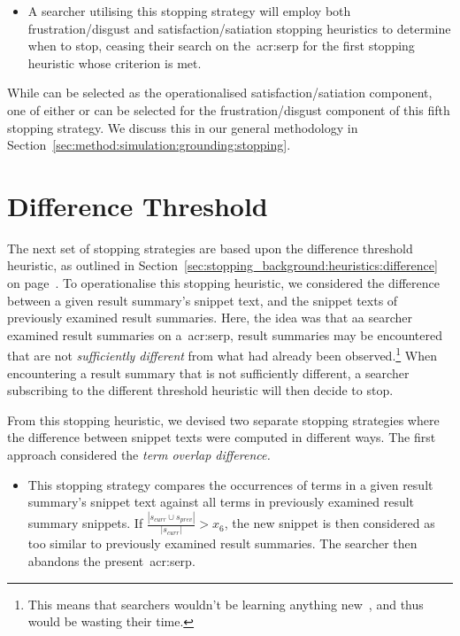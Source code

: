 \begin{itemize}
    \item{ A searcher utilising this stopping strategy will employ both frustration/disgust and satisfaction/satiation stopping heuristics to determine when to stop, ceasing their search on the~\gls{acr:serp} for the first stopping heuristic whose criterion is met.}
\end{itemize}

While  can be selected as the operationalised satisfaction/satiation component, one of either  or  can be selected for the frustration/disgust component of this fifth stopping strategy. We discuss this in our general methodology in Section~\ref{sec:method:simulation:grounding:stopping}.

\section{Difference Threshold}
The next set of stopping strategies are based upon the difference threshold heuristic, as outlined in Section~\ref{sec:stopping_background:heuristics:difference} on page~\pageref{sec:stopping_background:heuristics:difference}. To operationalise this stopping heuristic, we considered the difference between a given result summary's snippet text, and the snippet texts of previously examined result summaries. Here, the idea was that aa searcher examined result summaries on a~\gls{acr:serp}, result summaries may be encountered that are not \emph{sufficiently different} from what had already been observed.\footnote{This means that searchers wouldn't be learning anything new~\citep{nickles1995judgment}, and thus would be wasting their time.} When encountering a result summary that is not sufficiently different, a searcher subscribing to the different threshold heuristic will then decide to stop.

From this stopping heuristic, we devised two separate stopping strategies where the difference between snippet texts were computed in different ways. The first approach considered the \emph{term overlap difference.}

\begin{itemize}
    \item{ This stopping strategy compares the occurrences of terms in a given result summary's snippet text against all terms in previously examined result summary snippets. If $\frac{|s_{curr} \cup s_{prev}|}{|s_{curr}|} > x_6$, the new snippet is then considered as too similar to previously examined result summaries. The searcher then abandons the present~\gls{acr:serp}.}
\end{itemize}

